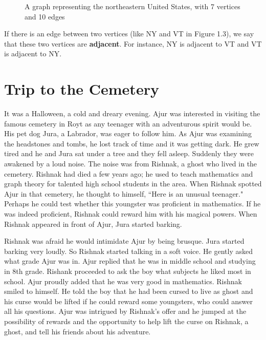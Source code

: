 \begin{figure}
\begin{center}
\caption{A graph representing the northeastern United States, with 7 vertices and 10 edges}\label{1g3}
\end{center}
\end{figure}
\begin{newpage}
\end{newpage}

If there is an edge between two vertices (like NY and VT in Figure 1.3), we say that these two vertices are \textbf{adjacent}. For instance, NY is adjacent to VT and VT is adjacent to NY.

   

\chapter{Trip to the Cemetery}
It was a Halloween, a cold and dreary evening. Ajur was interested in visiting the famous cemetery in Royt as any teenager with an adventurous spirit would be. His pet dog Jura, a Labrador, was eager to follow him. As Ajur was examining the headstones and tombs, he lost track of time and it was getting dark. He grew tired and he and Jura sat under a tree and they fell asleep. Suddenly they were awakened by a loud noise. The noise was from Rishnak, a ghost who lived in the cemetery. Rishnak had died a few years ago; he used to teach mathematics and graph theory for talented high school students in the area. When Rishnak spotted Ajur in that cemetery, he thought to himself, ``Here is an unusual teenager." Perhaps he could test whether this youngster  was proficient in mathematics. If he was indeed proficient, Rishnak could reward him with his magical powers. When Rishnak appeared in front of Ajur, Jura started barking.  

Rishnak was afraid he would intimidate Ajur by being brusque. Jura started barking very loudly. So Rishnak started talking in a soft voice. He gently asked what grade Ajur was in. Ajur replied that he was in middle school and studying in 8th grade. Rishank proceeded to ask the boy what subjects he liked most in school. Ajur proudly added that he was very good in mathematics. Rishnak smiled to himself. He told the boy that he had been cursed to live as ghost and his curse would be lifted if he could reward some youngsters, who could answer all his questions. Ajur was intrigued by Rishnak's offer and he jumped at the possibility of rewards and the opportunity to help lift the curse on Rishnak, a ghost, and tell his friends about his adventure.